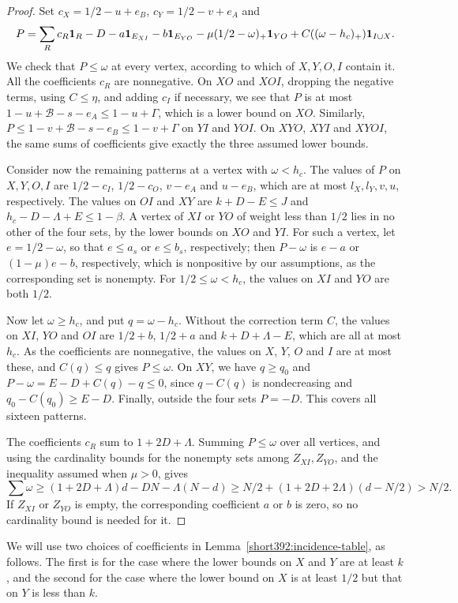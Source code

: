 \begin{proof}
Set $c_X=1/2-u+e_B$, $c_Y=1/2-v+e_A$ and
\[
 P=\sum_Rc_R\mathbf 1_R-D-a\mathbf 1_{E_{XI}}-b\mathbf 1_{E_{YO}}
 -\mu(1/2-\omega)_+\mathbf 1_{YO}+C((\omega-h_c)_+)\mathbf 1_{I\cup X}.
\]
We check that $P\le\omega$ at every vertex, according to which of $X,Y,O,I$ contain it. All the coefficients $c_R$ are nonnegative. On $XO$ and $XOI$, dropping the negative terms, using $C\le\eta$,
and adding $c_I$ if necessary, we see that $P$ is at most $1-u+\mathcal B-s-e_A\le1-u+\Gamma$, which is a lower bound on $XO$.
Similarly, $P\le1-v+\mathcal B-s-e_B\le1-v+\Gamma$
on $YI$ and $YOI$.
On $XYO$, $XYI$ and $XYOI$,
the same sums of coefficients give exactly the three assumed lower bounds.

Consider now the remaining patterns at a vertex with $\omega<h_c$. The values of $P$ on $X,Y,O,I$ are
$1/2-c_I$, $1/2-c_O$, $v-e_A$ and $u-e_B$, which are at most $l_X,l_Y,v,u$, respectively.
The values on $OI$ and $XY$ are $k+D-E\le J$ and
$h_c-D-\Lambda+E\le1-\beta$.
A vertex of $XI$ or $YO$ of weight less than $1/2$ lies in no other of the four sets,
by the lower bounds on $XO$ and $YI$. For such a vertex, let $e=1/2-\omega$, so that $e\le a_s$ or $e\le b_s$, respectively;
then $P-\omega$ is $e-a$ or $(1-\mu)e-b$, respectively, which is
nonpositive by our assumptions, as the corresponding set is nonempty.
For $1/2\le\omega<h_c$, the values on $XI$ and $YO$ are both $1/2$.

Now let $\omega\ge h_c$, and put $q=\omega-h_c$. Without the correction term $C$,
the values on $XI$, $YO$ and $OI$ are $1/2+b$, $1/2+a$ and $k+D+\Lambda-E$, which are
all at most $h_c$. As the coefficients are nonnegative, the values on $X$, $Y$, $O$ and $I$ are at most these, and $C(q)\le q$ gives $P\le\omega$.
On $XY$, we have $q\ge q_0$ and
$P-\omega=E-D+C(q)-q\le0$, since $q-C(q)$ is nondecreasing
and $q_0-C(q_0)\ge E-D$. Finally, outside the four sets $P=-D$. This covers all sixteen patterns.

The coefficients $c_R$ sum to $1+2D+\Lambda$. Summing $P\le\omega$ over all vertices, and
using the cardinality bounds for the nonempty sets among $Z_{XI},Z_{YO}$, and the inequality assumed when $\mu>0$, gives
\[
 \sum\omega\ge(1+2D+\Lambda)d-DN-\Lambda(N-d)
          \ge N/2+(1+2D+2\Lambda)(d-N/2)>N/2.
\]
If $Z_{XI}$ or $Z_{YO}$ is empty, the corresponding coefficient $a$ or $b$ is zero, so no cardinality bound is needed for it.
\end{proof}

We will use two choices of coefficients in Lemma~\ref{short392:incidence-table}, as follows. The first is for the case where the lower bounds on $X$ and $Y$ are at least $k$, and the second for the case where the lower bound on $X$ is at least $1/2$ but that on $Y$ is less than $k$.


